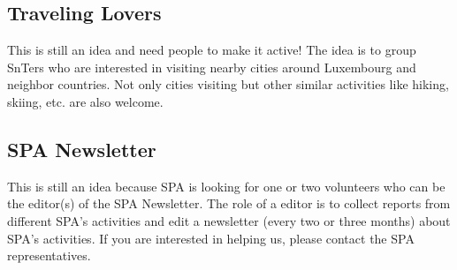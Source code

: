 \subsection{Traveling Lovers}
This is still an idea and need people to make it active! 
The idea is to group SnTers who are interested in visiting nearby cities around Luxembourg and neighbor countries. 
Not only cities visiting but other similar activities like hiking, skiing, etc. are also welcome. 

\subsection{SPA Newsletter}
This is still an idea because SPA is looking for one or two volunteers who can be the editor(s) of the SPA Newsletter. 
The role of a editor is to collect reports from different SPA's activities and edit a newsletter (every two or three months) about SPA's activities. 
If you are interested in helping us, please contact the SPA representatives. 